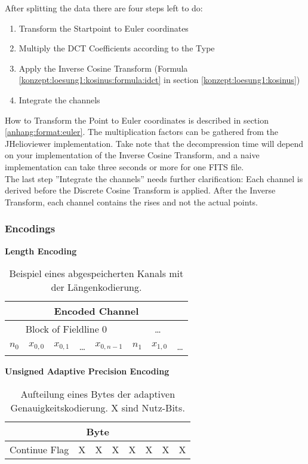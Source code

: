 After splitting the data there are four steps left to do: 
\begin{enumerate}
	\item Transform the Startpoint to Euler coordinates
	\item Multiply the DCT Coefficients according to the Type
	\item Apply the Inverse Cosine Transform (Formula \eqref{konzept:loesung1:kosinus:formula:idct} in section \ref{konzept:loesung1:kosinus})
	\item Integrate the channels
\end{enumerate}
How to Transform the Point to Euler coordinates is described in section \ref{anhang:format:euler}. The multiplication factors can be gathered from the JHelioviewer implementation. Take note that the decompression time will depend on your implementation of the Inverse Cosine Transform, and a naive implementation can take three seconds or more for one FITS file.\\
The last step ''Integrate the channels'' needs further clarification: Each channel is derived before the Discrete Cosine Transform is applied. After the Inverse Transform, each channel contains the rises and not the actual points.

\subsubsection*{Encodings} \label{anhang:format:encodings}

\textbf{Length Encoding}\\
\begin{table}[!htbp]
	\center
	\begin{tabular}{||c|c|c|c|c||c|c|c}
		\hline
		\multicolumn{8}{|c|}{Encoded Channel}\\\hline\hline
		 \multicolumn{5}{||c||}{Block of Fieldline 0} & \multicolumn{3}{c}{\ldots} \\\hline
		$n_0$ &$x_{0,0}$ &$x_{0,1}$ & \ldots & $x_{0,n-1}$ & $n_1$ & $x_{1,0}$ & \ldots\\\hline
	\end{tabular}
	\caption{Beispiel eines abgespeicherten Kanals mit der Längenkodierung.}
	\label{anhang:format:encodings:laengenkodierung}
\end{table}

\textbf{Unsigned Adaptive Precision Encoding}\\
\begin{table}[!htbp]
	\center
	\begin{tabular}{|c|c|c|c||c|c|c|c|}
	\hline
	\multicolumn{8}{|c|}{Byte}\\\hline
	Continue Flag & X & X & X & X & X & X & X \\\hline
	\end{tabular}
	\caption{Aufteilung eines Bytes der adaptiven Genauigkeitskodierung. X sind Nutz-Bits.}
	\label{anhang:format:encodings:adaptiveUnsigned}
\end{table}

